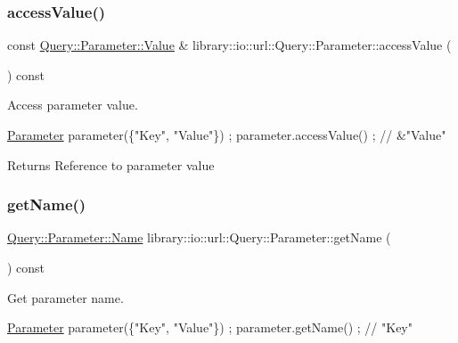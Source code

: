 \subsubsection{\texorpdfstring{access\+Value()}{accessValue()}}
{\footnotesize\ttfamily const \hyperlink{classlibrary_1_1io_1_1url_1_1_query_1_1_parameter_a46e7a7b97d44f51f83d6261f70ba0a5e}{Query\+::\+Parameter\+::\+Value} \& library\+::io\+::url\+::\+Query\+::\+Parameter\+::access\+Value (\begin{DoxyParamCaption}{ }\end{DoxyParamCaption}) const}



Access parameter value. 


\begin{DoxyCode}
\hyperlink{classlibrary_1_1io_1_1url_1_1_query_1_1_parameter_ad6160646a07cb92213403426dbba4c64}{Parameter} parameter(\{\textcolor{stringliteral}{"Key"}, \textcolor{stringliteral}{"Value"}\}) ;
parameter.accessValue() ; \textcolor{comment}{// &"Value"}
\end{DoxyCode}


\begin{DoxyReturn}{Returns}
Reference to parameter value 
\end{DoxyReturn}
\mbox{\label{classlibrary_1_1io_1_1url_1_1_query_1_1_parameter_a297c9b89738697c28cc5d223a6c523c7}} 
\subsubsection{\texorpdfstring{get\+Name()}{getName()}}
{\footnotesize\ttfamily \hyperlink{classlibrary_1_1io_1_1url_1_1_query_1_1_parameter_a7edf5fb8a4ae57aed1ce5dfa2405c981}{Query\+::\+Parameter\+::\+Name} library\+::io\+::url\+::\+Query\+::\+Parameter\+::get\+Name (\begin{DoxyParamCaption}{ }\end{DoxyParamCaption}) const}



Get parameter name. 


\begin{DoxyCode}
\hyperlink{classlibrary_1_1io_1_1url_1_1_query_1_1_parameter_ad6160646a07cb92213403426dbba4c64}{Parameter} parameter(\{\textcolor{stringliteral}{"Key"}, \textcolor{stringliteral}{"Value"}\}) ;
parameter.getName() ; \textcolor{comment}{// "Key"}
\end{DoxyCode}


